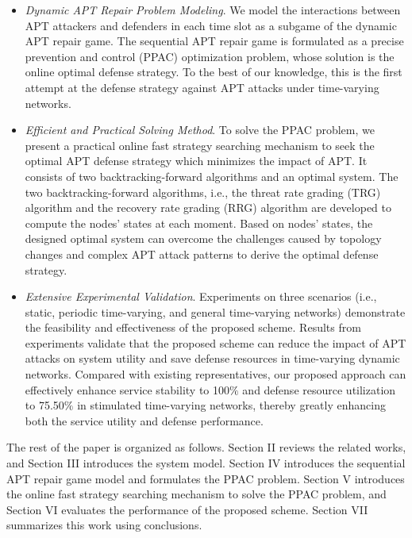\documentclass[lettersize,journal]{IEEEtran}
\begin{document}
\begin{itemize}
      \item \textit{Dynamic APT Repair Problem Modeling}. We model the interactions between APT attackers and defenders in each time slot as a subgame of the dynamic APT repair game. The sequential APT repair game is formulated as a precise prevention and control (PPAC) optimization problem, whose solution is the online optimal defense strategy. To the best of our knowledge, this is the first attempt at the defense strategy against APT attacks under time-varying networks.
      \item \textit{Efficient and Practical Solving Method}. To solve the PPAC problem, we present a practical online fast strategy searching mechanism to seek the optimal APT defense strategy which minimizes the impact of APT. It consists of two backtracking-forward algorithms and an optimal system. The two backtracking-forward algorithms, i.e., the threat rate grading (TRG) algorithm and the recovery rate grading (RRG) algorithm are developed to compute the nodes' states at each moment. Based on nodes' states, the designed optimal system can overcome the challenges caused by topology changes and complex APT attack patterns to derive the optimal defense strategy.
   
      \item \textit{Extensive Experimental Validation}. Experiments on three scenarios (i.e., static, periodic time-varying, and general time-varying networks) demonstrate the feasibility and effectiveness of the proposed scheme. Results from experiments validate that the proposed scheme can reduce the impact of APT attacks on system utility and save defense resources in time-varying dynamic networks. Compared with existing representatives, our proposed approach can effectively enhance service stability to 100$\%$ and defense resource utilization to 75.50$\%$ in stimulated time-varying networks, thereby greatly enhancing both the service utility and defense performance.
      
  \end{itemize} \par

 The rest of the paper is organized as follows. Section II reviews the related works, and Section III introduces the system model. Section IV introduces the sequential APT repair game model and formulates the PPAC problem. Section V introduces the online fast strategy searching mechanism to solve the PPAC problem, and Section VI evaluates the performance of the proposed scheme. Section VII summarizes this work using conclusions.  
\end{document}
